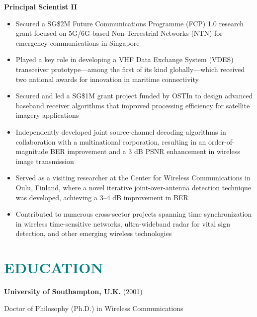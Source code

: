 \documentclass[a4paper, 11pt]{article}
\begin{document}
	{\raggedleft \large \bf Principal Scientist II}
		
	\vspace{3pt}
		
	\begin{itemize}[leftmargin=*, itemsep=-1mm]
			
		\item Secured a SG\$2M Future Communications Programme (FCP) 1.0 research grant focused on 5G/6G-based Non-Terrestrial Networks (NTN) for emergency communications in Singapore 
		
		\item Played a key role in developing a VHF Data Exchange System (VDES) transceiver prototype—among the first of its kind globally—which received two national awards for innovation in maritime connectivity 
		
		\item Secured and led a SG\$1M grant project funded by OSTIn to design advanced baseband receiver algorithms that improved processing efficiency for satellite imagery applications 
		
		\item Independently developed joint source-channel decoding algorithms in collaboration with a multinational corporation, resulting in an order-of-magnitude BER improvement and a 3 dB PSNR enhancement in wireless image transmission  
		
		\item Served as a visiting researcher at the Center for Wireless Communications in Oulu, Finland, where a novel iterative joint-over-antenna detection technique was developed, achieving a 3–4 dB improvement in BER
		
		\item Contributed to numerous cross-sector projects spanning time synchronization in wireless time-sensitive networks, ultra-wideband radar for vital sign detection, and other emerging wireless technologies
			
	\end{itemize}
		
		
\section{\textcolor{teal}{\bf{EDUCATION}}}

	\vspace{3pt}
	
	{\bf University of Southampton, U.K.} (2001)
	
	{\raggedleft Doctor of Philosophy (Ph.D.) in Wireless Communications}
	
\end{document}
